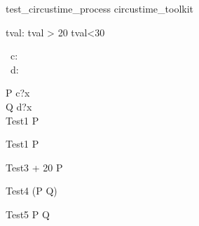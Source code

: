 \begin{zsection}
   \SECTION test\_circustime\_process \parents circustime\_toolkit
\end{zsection}

\begin{axdef}
   tval: \nat
\where
   tval > 20 \land tval<30
\end{axdef}

\begin{circus}
     \circchannel\ c: \nat \\
     \circchannel\ d: \nat \\
\end{circus}

\begin{circus}
    \circprocess P \circdef \circbegin \circspot c?x \then \Skip \circend \\
    \circprocess Q \circdef \circbegin \circspot d?x \then \Skip \circend \\
    
    \circprocess Test1 \circdef {} \rcirctime \circstartby P \\
\end{circus}

\begin{circus}
   \circprocess Test1 \circdef  {} \rcirctime \circstartby P  \\
\end{circus}


\begin{circus}
   \circprocess Test3 \circdef  {} + 20 \rcirctime \circstartby P  \\
\end{circus}


\begin{circus}
   \circprocess Test4 \circdef  {} \rcirctime \circstartby (P \circseq Q) \\
\end{circus}


 \begin{circus}
    \circprocess Test5 \circdef  {} \rcirctime \circstartby P  \circseq Q\\
 \end{circus}


